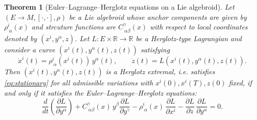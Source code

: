 \documentclass[10pt,a4paper]{amsart}
\newtheorem{theorem}{Theorem}
\begin{document}
\begin{theorem}[Euler--Lagrange--Herglotz equations on a Lie algebroid]
\label{thm:ELH_algebroid}
Let $(E\to M,[\cdot,\cdot],\rho)$ be a Lie algebroid whose anchor components are given by
$\rho^i_{\ \alpha}(x)$ and strcuture functions are $C^\gamma_{\ \alpha\beta}(x)$ with respect to local coordinates denoted by $(x^{i},y^{\alpha},z)$.
Let $L\colon E\times\mathbb{R}\to\mathbb{R}$ be a Herglotz-type Lagrangian and consider a curve $(x^{i}(t),y^{\alpha}(t),z(t))$ satisfying
\begin{equation}\label{eq:ELH_constraints}
\dot x^i(t) = \rho^i_{\ \alpha}(x^{i}(t))\,y^\alpha(t), 
\qquad
\dot z(t) = L(x^{i}(t),y^{\alpha}(t),z(t)).
\end{equation}
Then $(x^{i}(t),y^{\alpha}(t),z(t))$ is a Herglotz extremal, i.e. satisfies
\eqref{eq:stationary} for all admissible variations with $x^{i}(0),x^{i}(T),z(0)$ fixed, 
if and only if it satisfies the Euler--Lagrange--Herglotz equations:
\begin{equation}\label{eq:ELH_equations}
\frac{d}{dt}\left(\frac{\partial L}{\partial y^\alpha}\right)
+ C^\gamma_{\ \alpha\beta}(x)\,y^\beta \frac{\partial L}{\partial y^\gamma}
- \rho^i_{\ \alpha}(x)\,\frac{\partial L}{\partial x^i}
- \frac{\partial L}{\partial z}\,\frac{\partial L}{\partial y^\alpha}
= 0.
\end{equation}
\end{theorem}
\end{document}
